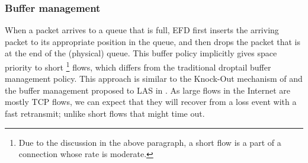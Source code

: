 \documentclass[preprint,12pt]{elsarticle}
\begin{document}
% 

\subsubsection{Buffer management}
When a packet arrives to a queue that is full, EFD first inserts the arriving packet to its appropriate position in the queue, and then drops the packet that is at the end of the (physical) queue. This buffer policy implicitly gives space priority to short \footnote{Due to the discussion in the above paragraph, a short flow is a part of a connection whose rate is moderate.} flows, which differs from the traditional droptail buffer management policy. This approach is similar to the Knock-Out mechanism of \cite{DivakaranCAP10} and the buffer management proposed to LAS in \cite{Rai04size-basedscheduling}. As large flows in the Internet are mostly TCP flows, we can expect that they will recover from a loss event with a fast retransmit; unlike short flows that might time out. %

\end{document}
